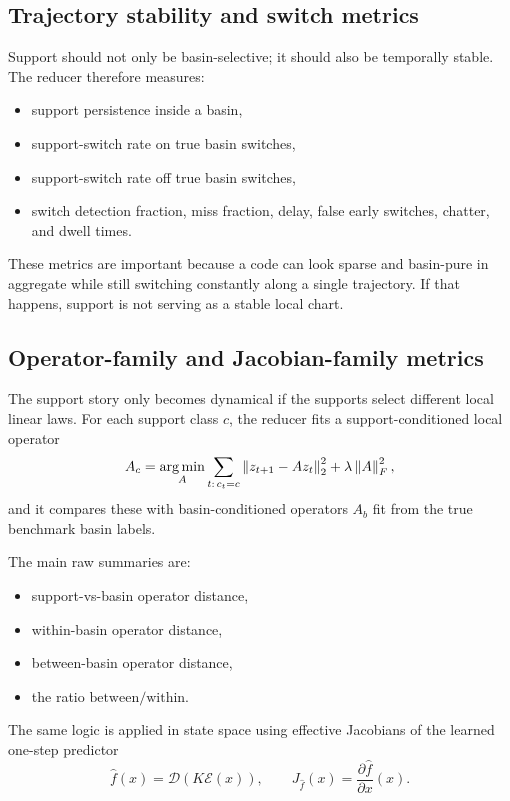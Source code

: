 \documentclass[11pt]{article}
\newcommand{\Enc}{\mathcal{E}}
\newcommand{\Dec}{\mathcal{D}}
\newcommand{\argmin}{\operatornamewithlimits{arg\,min}}
\newcommand{\norm}[1]{\left\lVert #1 \right\rVert}
\begin{document}
\subsection{Trajectory stability and switch metrics}

Support should not only be basin-selective; it should also be temporally
stable. The reducer therefore measures:
\begin{itemize}[leftmargin=1.5em]
    \item support persistence inside a basin,
    \item support-switch rate on true basin switches,
    \item support-switch rate off true basin switches,
    \item switch detection fraction, miss fraction, delay, false early
    switches, chatter, and dwell times.
\end{itemize}

These metrics are important because a code can look sparse and basin-pure in
aggregate while still switching constantly along a single trajectory. If that
happens, support is not serving as a stable local chart.

\subsection{Operator-family and Jacobian-family metrics}

The support story only becomes dynamical if the supports select different local
linear laws. For each support class $c$, the reducer fits a support-conditioned
local operator
\begin{equation}
    A_c
    =
    \argmin_A
    \sum_{t:\,c_t=c}
    \norm{z_{t+1} - A z_t}_2^2
    + \lambda \norm{A}_F^2,
\end{equation}
and it compares these with basin-conditioned operators $A_b$ fit from the true
benchmark basin labels.

The main raw summaries are:
\begin{itemize}[leftmargin=1.5em]
    \item support-vs-basin operator distance,
    \item within-basin operator distance,
    \item between-basin operator distance,
    \item the ratio
    $\text{between}/\text{within}$.
\end{itemize}

The same logic is applied in state space using effective Jacobians of the
learned one-step predictor
\begin{equation}
    \hat f(x) = \Dec(K \Enc(x)),
    \qquad
    J_{\hat f}(x) = \frac{\partial \hat f}{\partial x}(x).
\end{equation}
\end{document}
